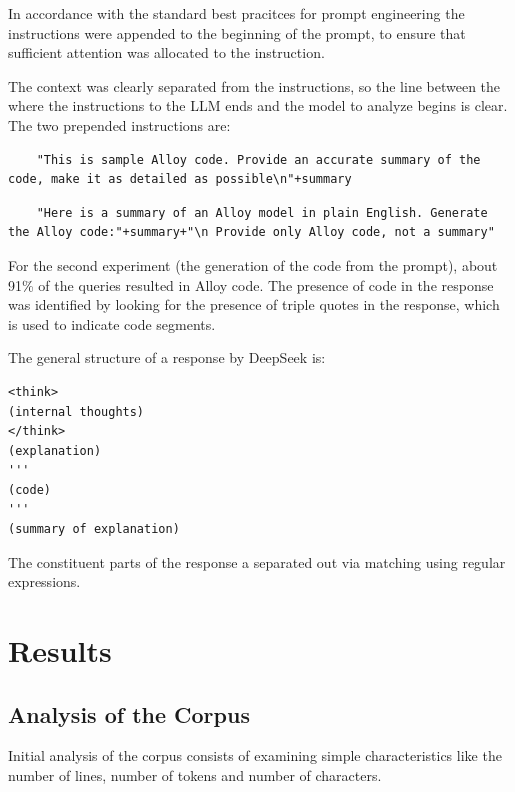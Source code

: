 \documentclass[conference]{IEEEtran}
\begin{document}
In accordance with the standard best pracitces for prompt engineering the instructions were appended to the beginning of the prompt, to ensure that sufficient attention was allocated to the instruction. 

The context was clearly separated from the instructions, so the line between the where the instructions to the LLM ends and the model to analyze begins is clear. The two prepended instructions are:

\begin{lstlisting}
    "This is sample Alloy code. Provide an accurate summary of the code, make it as detailed as possible\n"+summary
\end{lstlisting}

\begin{lstlisting}
    "Here is a summary of an Alloy model in plain English. Generate the Alloy code:"+summary+"\n Provide only Alloy code, not a summary"
\end{lstlisting}

For the second experiment (the generation of the code from the prompt), about 91\% of the queries resulted in Alloy code. The presence of code in the response was identified by looking for the presence of triple quotes in the response, which is used to indicate code segments.

The general structure of a response by DeepSeek is:

\begin{lstlisting}
<think>
(internal thoughts)
</think>
(explanation)
'''
(code)
'''
(summary of explanation)
\end{lstlisting}

The constituent parts of the response a separated out via matching using regular expressions.

\section{Results}

\subsection{Analysis of the Corpus}

Initial analysis of the corpus consists of examining simple characteristics like the number of lines, number of tokens and number of characters.
\end{document}
